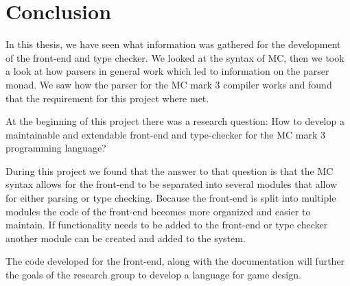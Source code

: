 \section{Conclusion}

In this thesis, we have seen what information was gathered for the development of the front-end and type checker. We looked at the syntax of MC, then we took a look at how parsers in general work which led to information on the parser monad. We saw how the parser for the MC mark 3 compiler works and found that the requirement for this project where met.

At the beginning of this project there was a research question: How to develop a maintainable and extendable front-end and type-checker for the MC mark 3 programming language?

During this project we found that the answer to that question is that the MC syntax allows for the front-end to be separated into several modules that allow for either parsing or type checking. Because the front-end is split into multiple modules the code of the front-end becomes more organized and easier to maintain. If functionality needs to be added to the front-end or type checker another module can be created and added to the system.

The code developed for the front-end, along with the documentation will further the goals of the research group to develop a language for game design. 



